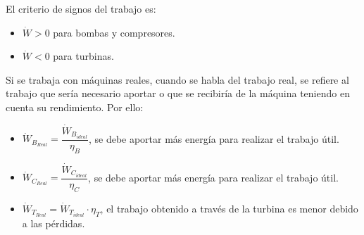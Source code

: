 El criterio de signos del trabajo es:
\begin{itemize}
	\item $\dot{W}>0$ para bombas y compresores.
	\item $\dot{W}<0$ para turbinas.
\end{itemize}


Si se trabaja con máquinas reales, cuando se habla del trabajo real, se refiere al trabajo que sería necesario aportar o que se recibiría de la máquina teniendo en cuenta su rendimiento. Por ello:
\begin{itemize}
	\item $\dot{W}_{B_{Real}}=\dfrac{\dot{W}_{B_{ideal}}}{\eta_B}$, se debe aportar más energía para realizar el trabajo útil.
	\item $\dot{W}_{C_{Real}}=\dfrac{\dot{W}_{C_{ideal}}}{\eta_C}$, se debe aportar más energía para realizar el trabajo útil.
	\item $\dot{W}_{T_{Real}}=\dot{W}_{T_{ideal}}\cdot \eta_T$, el trabajo obtenido a través de la turbina es menor debido a las pérdidas.
\end{itemize}
